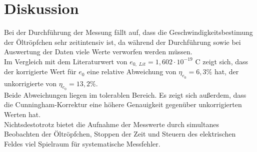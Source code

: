 \section{Diskussion}
\label{sec:Diskussion}


Bei der Durchführung der Messung fällt auf, dass die 
Geschwindigkeitsbestimung der Öltröpfchen sehr zeitintensiv ist, da während der 
Durchführung sowie bei Auswertung der Daten viele Werte verworfen werden müssen. \\
Im Vergleich mit dem Literaturwert von $e_{0, \; Lit} = 1,602 \cdot 10^{-19}$ C \cite{enull} zeigt sich, dass der korrigierte Wert für $e_0$ eine 
relative Abweichung von $\eta_{e_0} = 6,3 \%$ hat, der unkorrigierte von $\eta_{e_0} = 13,2 \%$. \\
Beide Abweichungen liegen im tolerablen Bereich. Es zeigt sich außerdem, dass die Cunningham-Korrektur
eine höhere Genauigkeit gegenüber unkorrigierten Werten hat.\\
Nichtsdestotrotz bietet die Aufnahme der Messwerte durch simultanes Beobachten der Öltröpfchen, Stoppen der Zeit und Steuern des 
elektrischen Feldes viel Spielraum für systematische Messfehler. \\